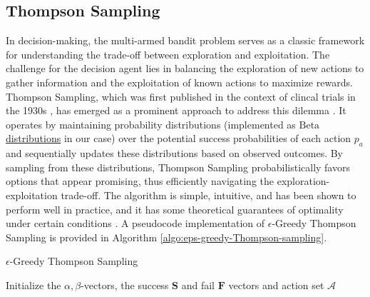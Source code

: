 \documentclass[11pt]{article}
\theoremstyle{definition}
\begin{document}
\subsection{Thompson Sampling}\label{sec:exploration-and-exploitation}
In decision-making, the multi-armed bandit problem serves as a classic framework for understanding the trade-off between exploration and exploitation. 
The challenge for the decision agent lies in balancing the exploration of new actions to gather information and the exploitation of known actions to maximize rewards. 
Thompson Sampling, which was first published in the context of clincal trials in the 1930s \citep{Thompson-1933}, has emerged as a prominent approach to address this dilemma \citep{Russo-Thompson-Sampling}. 
It operates by maintaining probability distributions (implemented as \href{https://en.wikipedia.org/wiki/Beta_distribution}{$\text{Beta}$ distributions} in our case) over the potential success probabilities of each action $p_{a}$ and sequentially updates these distributions based on observed outcomes. 
By sampling from these distributions, Thompson Sampling probabilistically favors options that appear promising, thus efficiently navigating the exploration-exploitation trade-off. 
The algorithm is simple, intuitive, and has been shown to perform well in practice, and it has some theoretical guarantees of optimality under certain conditions \citep{Agrawal-2012}.
A pseudocode implementation of $\epsilon$-Greedy Thompson Sampling is provided in Algorithm \ref{algo:eps-greedy-Thompson-sampling}.
\begin{algorithm}[H]
    \caption{$\epsilon$-Greedy Thompson Sampling}\label{algo:eps-greedy-Thompson-sampling}
    \begin{algorithmic}[1]
        \normalsize
        \State Initialize the $\alpha, \beta$-vectors, the success $\mathbf{S}$ and fail $\mathbf{F}$ vectors and action set $\mathcal{A}$
        \Else{}
        \EndIf
        \EndFor
        \EndProcedure
    \end{algorithmic}
\end{algorithm}
\end{document}
